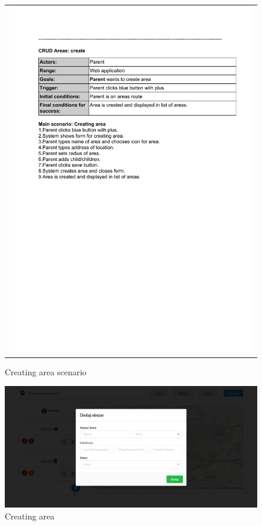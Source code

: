 \documentclass{sprawozdanie-agh}
\begin{document}
    	\begin{figure}[H]
    		\centering
    		\begin{tabular}{c}
    			\includegraphics[width=.80\textwidth]{crA_cropped}
    		\end{tabular}
    		\caption{Creating area scenario}
    	\end{figure}

    	\begin{figure}[H]
    		\centering
    		\includegraphics[width=.80\textwidth]{addArea}
    		\caption{Creating area}
    	\end{figure}
\end{document}
